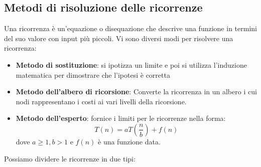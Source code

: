 \documentclass[12pt]{article}
\begin{document}
\subsection{Metodi di risoluzione delle ricorrenze}
Una ricorrenza è un'equazione o disequazione che descrive una funzione
in termini del suo valore con input più piccoli. Vi sono diversi modi per risolvere una ricorrenza:
\begin{itemize}
    \item \textbf{Metodo di sostituzione}: si ipotizza un limite e poi si utilizza l'induzione matematica per dimostrare che l'ipotesi è corretta
    \item \textbf{Metodo dell'albero di ricorsione}: Converte la ricorrenza in un albero i cui nodi rappresentano i costi ai vari livelli della ricorsione.
    \item \textbf{Metodo dell'esperto}: fornice i limiti per le ricorrenze nella forma:
    $$T(n) = aT(\frac{n}{b}) + f(n)$$
    dove $a \geq 1, b>1$ e $f(n)$ è una funzione data. 
\end{itemize}
Possiamo dividere le ricorrenze in due tipi:
\end{document}
